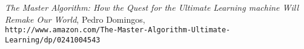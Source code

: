 \documentclass[a4paper, 10pt]{book}
\newcommand{\bs}{\boldsymbol}
\newcommand{\opn}{\operatorname}
\begin{document}

\begin{thebibliography}{9}
\textit{The Master Algorithm: How the Quest for the Ultimate Learning machine Will Remake Our World}, Pedro Domingos, \\\texttt{http://www.amazon.com/The-Master-Algorithm-Ultimate-Learning/dp/0241004543}
\end{thebibliography}
\end{document}
